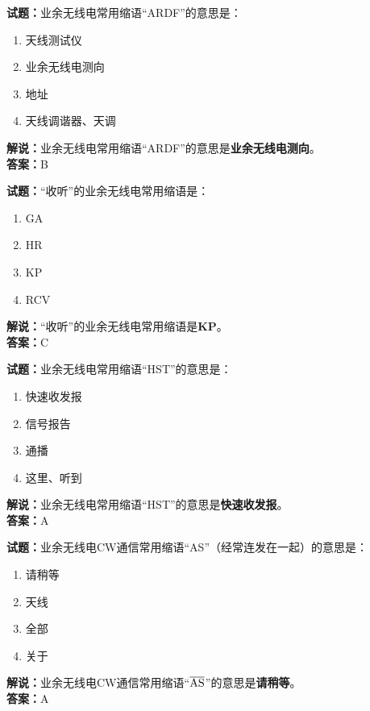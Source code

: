 \documentclass{ctexbook}
\begin{document}
\vspace{1em}

\textbf{试题：}业余无线电常用缩语“ARDF”的意思是：
\begin{enumerate}[leftmargin=3em]
  \item 天线测试仪
  \item 业余无线电测向
  \item 地址
  \item 天线调谐器、天调
\end{enumerate}
\noindent\textbf{解说：}业余无线电常用缩语“ARDF”的意思是\textbf{业余无线电测向}。\\\noindent\textbf{答案：}B

\vspace{1em}

\textbf{试题：}“收听”的业余无线电常用缩语是：
\begin{enumerate}[leftmargin=3em]
  \item GA
  \item HR
  \item KP
  \item RCV
\end{enumerate}
\noindent\textbf{解说：}“收听”的业余无线电常用缩语是\textbf{KP}。\\\noindent\textbf{答案：}C

\vspace{1em}

\textbf{试题：}业余无线电常用缩语“HST”的意思是：
\begin{enumerate}[leftmargin=3em]
  \item 快速收发报
  \item 信号报告
  \item 通播
  \item 这里、听到
\end{enumerate}
\noindent\textbf{解说：}业余无线电常用缩语“HST”的意思是\textbf{快速收发报}。\\\noindent\textbf{答案：}A

\vspace{1em}

\textbf{试题：}业余无线电CW通信常用缩语“AS”（经常连发在一起）的意思是：
\begin{enumerate}[leftmargin=3em]
  \item 请稍等
  \item 天线
  \item 全部
  \item 关于
\end{enumerate}
\noindent\textbf{解说：}业余无线电CW通信常用缩语“$\overline{\rm AS}$”的意思是\textbf{请稍等}。\\\noindent\textbf{答案：}A
\end{document}
